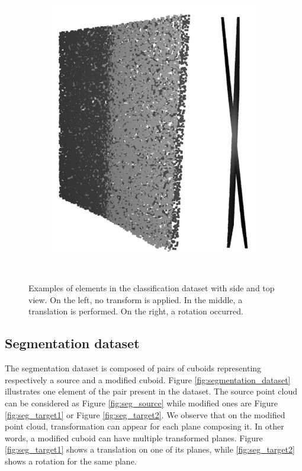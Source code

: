 \begin{figure}[ht]
\begin{subfigure}{.32\linewidth}
    \end{subfigure}
    \begin{subfigure}{0.32\linewidth}
    \centering
    \includegraphics[scale=0.4]{Img/06_plane3.png}
    \end{subfigure}\\
    \caption{Examples of elements in the classification dataset with side and top view. On the left, no transform is applied. In the middle, a translation is performed. On the right, a rotation occurred.}
    \label{fig:classification_dataset}
\end{figure}
\subsection{Segmentation dataset}
The segmentation dataset is composed of pairs of cuboids representing respectively a source and a modified cuboid. Figure \ref{fig:segmentation_dataset} illustrates one element of the pair present in the dataset. The source point cloud can be considered as Figure \ref{fig:seg_source} while modified ones are Figure \ref{fig:seg_target1} or Figure \ref{fig:seg_target2}. We observe that on the modified point cloud, transformation can appear for each plane composing it. In other words, a modified cuboid can have multiple transformed planes. Figure \ref{fig:seg_target1} shows a translation on one of its planes, while \ref{fig:seg_target2} shows a rotation for the same plane.\\

